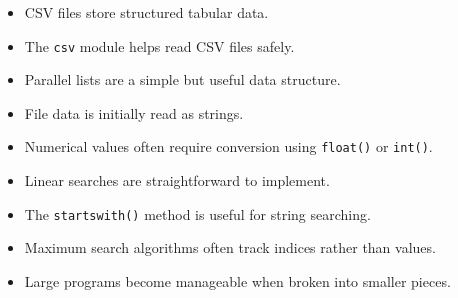\documentclass[11pt]{article}
\begin{document}
\begin{itemize}
    \item CSV files store structured tabular data.
    \item The \texttt{csv} module helps read CSV files safely.
    \item Parallel lists are a simple but useful data structure.
    \item File data is initially read as strings.
    \item Numerical values often require conversion using \texttt{float()} or \texttt{int()}.
    \item Linear searches are straightforward to implement.
    \item The \texttt{startswith()} method is useful for string searching.
    \item Maximum search algorithms often track indices rather than values.
    \item Large programs become manageable when broken into smaller pieces.
\end{itemize}
\end{document}
